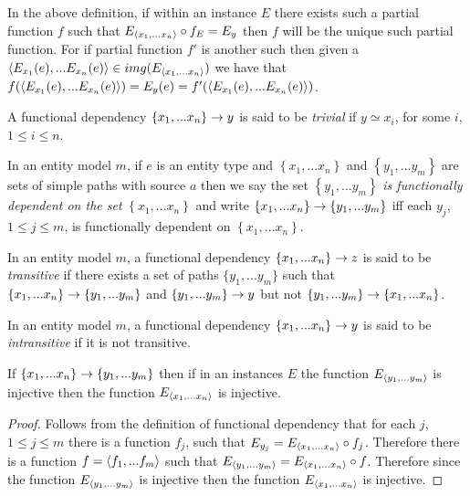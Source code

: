 \documentclass[10pt,a4paper]{article}
\newcommand{\set}[1]{\left\{#1\right\}}
\newcommand{\genericmodel}{\mathcal{M}}
\renewcommand{\genericmodel}{{m}}
\newcommand{\sfd}[2]{\ensuremath{\set{#1} \morph #2}}  %
\newcommand{\fd}[2]{\ensuremath{\sfd{#1}{\set{#2}}}}
\newcommand{\term}[1]{\textit{{#1}}}
\newcommand{\ntuple}[1]{\tuple{#1_1,...#1_n}}
\newcommand {\xntuple}{\ensuremath{\ntuple{x}}}
\begin{document}
\begin{remark}
In the above definition, if within an instance $E$ there exists such a partial function $f$ such that
$E_{\xntuple} \circ f_E = E_y$ then $f$ will be the unique such partial function. For if 
partial function $f'$ is another such then given a $\langle E_{x_1}(e),...E_{x_n}(e)\rangle \in img(E_{\langle x_1,...x_n\rangle})$
we have that $f(\langle E_{x_1}(e),...E_{x_n}(e)\rangle)=E_y(e)=f'(\langle E_{x_1}(e),...E_{x_n}(e)\rangle)$.
\end{remark}

\begin{definition}
A functional dependency \sfd{x_1,...x_n}{y} is said to be \term{trivial} if $y\simeq x_i$, for some $i$, $1 \leq i \leq n$.
\end{definition}

\begin{definition}
In an entity model $\genericmodel$, if
$e$ is an entity type and $\set{x_1,...x_n}$ and $\set{y_1,...y_m}$ are sets of simple paths with source $a$
then we say the set $\set{y_1,...y_m}$ \textit{is functionally dependent on the set} $\set{x_1,...x_n}$ and write
\fd{x_1,...x_n}{y_1,...y_m} 
iff  each $y_j$, $1 \leq j \leq m$, is functionally dependent on $\set{x_1,...x_n}$.
\end{definition}
\begin{definition} %
In an entity model $\genericmodel$, a functional dependency $\set{x_1,...x_n} \morph z$
is said to be \term{transitive} if there exists a set of paths $\{y_1,...y_{m}\}$ such that
$\set{x_1,...x_n} \morph \set{y_1,...y_{m}}$ and $\set{y_1,...y_{m}} \morph y$ but not
$\{y_1,...y_{m}\} \rightarrow \{x_1,...x_n\}$.
\end{definition}
\begin{definition} %
In an entity model $\genericmodel$, a functional dependency $\set{x_1,...x_n} \morph y$
is said to be \term{intransitive} if it is not transitive.
\end{definition}
\begin{lemma}
\label{transitiveinjectivelemma}
If $\set{x_1,...x_n} \morph \set{y_1,...y_{m}}$ then if in an instances $E$ the function $E_{\langle y_1,...y_{m}\rangle}$ is 
injective then the function $E_{\langle x_1,...x_n\rangle}$  is injective.
\end{lemma}
\begin{proof}
Follows from the definition of functional dependency that for each $j$, $1 \leq j \leq m$  there is a function ${f_j}$,  such that
$E_{y_j}=E_{\langle x_1,...x_n\rangle}\circ f_j$. Therefore there is a function $f=\langle f_1,...f_m\rangle$ such that
$E_{\langle y_1,...y_m\rangle}= E_{\langle x_1,...x_n\rangle}\circ f $. Therefore since  the function $E_{\langle y_1,...y_{m}\rangle}$ is 
injective then the function $E_{\langle x_1,...x_n\rangle}$  is injective.
\end{proof}
\end{document}
